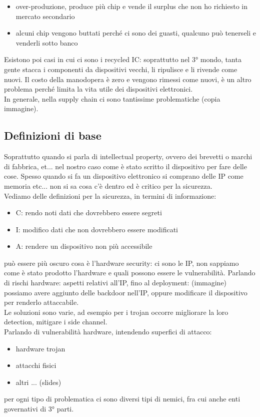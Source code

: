 \documentclass[oneside, 12pt]{extbook}
\begin{document}
\begin{itemize}
	\item over-produzione, produce più chip e vende il surplus che non ho richiesto in mercato secondario
	\item alcuni chip vengono buttati perché ci sono dei guasti, qualcuno può tenerseli e venderli sotto banco
\end{itemize}
Esistono poi casi in cui ci sono i recycled IC: soprattutto nel 3° mondo, tanta gente stacca i componenti da dispositivi vecchi, li ripulisce e li rivende come nuovi. Il costo della manodopera è zero e vengono rimessi come nuovi, è un altro problema perché limita la vita utile dei dispositivi elettronici.\\In generale, nella supply chain ci sono tantissime problematiche (copia immagine).
\subsection{Definizioni di base}
Soprattutto quando si parla di intellectual property, ovvero dei brevetti o marchi di fabbrica, et... nel nostro caso come è stato scritto il dispositivo per fare delle cose. Spesso quando si fa un dispositivo elettronico si comprano delle IP come memoria etc... non si sa cosa c'è dentro ed è critico per la sicurezza.\\Vediamo delle definizioni per la sicurezza, in termini di informazione:
\begin{itemize}
	\item C: rendo noti dati che dovrebbero essere segreti
	\item I: modifico dati che non dovrebbero essere modificati
	\item A: rendere un dispositivo non più accessibile
\end{itemize}
può essere più oscuro cosa è l'hardware security: ci sono le IP, non sappiamo come è stato prodotto l'hardware e quali possono essere le vulnerabilità. Parlando di rischi hardware: aspetti relativi all'IP, fino al deployment:
(immagine)
possiamo avere aggiunto delle backdoor nell'IP, oppure modificare il dispositivo per renderlo attaccabile.\\Le soluzioni sono varie, ad esempio per i trojan occorre migliorare la loro detection, mitigare i side channel.\\Parlando di vulnerabilità hardware, intendendo superfici di attacco:
\begin{itemize}
	\item hardware trojan
	\item attacchi fisici
	\item altri ... (slides)
\end{itemize}
per ogni tipo di problematica ci sono diversi tipi di nemici, fra cui anche enti governativi di 3° parti.
\end{document}
